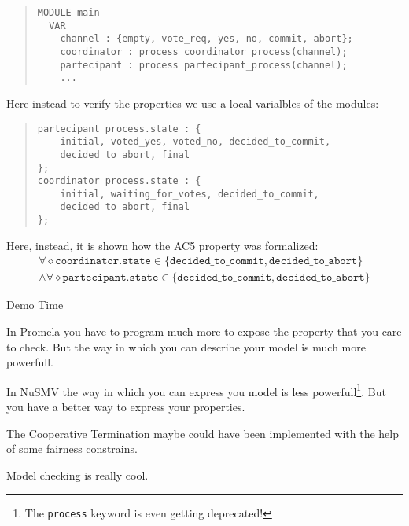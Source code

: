\documentclass[landscape]{slides}
\newcommand{\slidetitle}{}
\newcommand{\settitle}[1]{\renewcommand{\slidetitle}{#1}}
\begin{document}
\begin{slide}
\settitle{NuSMV Model}
\begin{quote}
\begin{verbatim}
MODULE main
  VAR
    channel : {empty, vote_req, yes, no, commit, abort};
    coordinator : process coordinator_process(channel);
    partecipant : process partecipant_process(channel);
    ...
\end{verbatim}
\end{quote}

\begin{overlay}
Here instead to verify the properties we use a local varialbles of the  modules:
\begin{quote}
\begin{verbatim}
partecipant_process.state : {
    initial, voted_yes, voted_no, decided_to_commit,
    decided_to_abort, final
};
coordinator_process.state : {
    initial, waiting_for_votes, decided_to_commit,
    decided_to_abort, final
};
\end{verbatim}
\end{quote}
\end{overlay}

\begin{overlay}
Here, instead, it is shown how the AC5 property was formalized:
\begin{displaymath}
\newcommand{\eventually}{\mathop{\diamond}\nolimits}
\begin{array}{l}
\forall\eventually \mathtt{coordinator.state} \in
	\{\mathtt{decided\_to\_commit}, \mathtt{decided\_to\_abort}\}\\
\land \forall\eventually \mathtt{partecipant.state} \in
	\{\mathtt{decided\_to\_commit}, \mathtt{decided\_to\_abort}\}
\end{array}
\end{displaymath}
\end{overlay}
\end{slide}

\begin{slide}
\begin{center}
\LARGE Demo Time
\end{center}
\end{slide}

\begin{slide}
\settitle{Experience Report}
In Promela you have to program much more to expose the property that you care to
check. But the way in which you can describe your model is much more powerfull.

In NuSMV the way in which you can express you model is less
powerfull\footnote{The \texttt{process} keyword is even getting deprecated!}.
But you have a better way to express your properties.
\end{slide}

\begin{slide}
\settitle{What could have been done better?}
The Cooperative Termination maybe could have been implemented with the help of
some fairness constrains.
\end{slide}

\begin{slide}
\settitle{In Conclusion}
\centering Model checking is really cool.
\end{slide}
\end{document}
